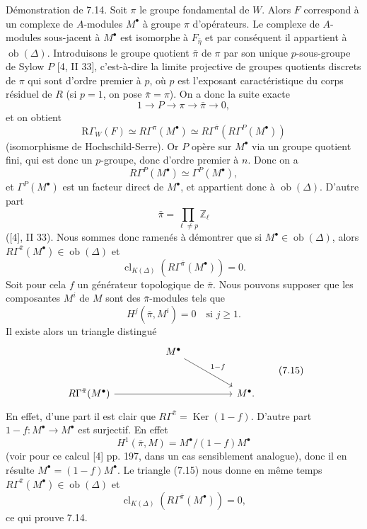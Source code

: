 \documentclass[11pt]{article}
\providecommand{\Ker}{\operatorname{Ker}}
\providecommand{\Ob}{\operatorname{ob}}
\providecommand{\Ker}{\operatorname{Ker}}
\providecommand{\Ker}{\operatorname{Ker}}
\providecommand{\Ob}{\operatorname{ob}}
\providecommand{\Ob}{\operatorname{Ob}}
\providecommand{\clK}[1]{\operatorname{cl}_{K(#1)}}
\providecommand{\RG}{\mathrm R\Gamma}
\providecommand{\Ob}{\operatorname{ob}}
\providecommand{\Ob}{\operatorname{Ob}}
\begin{document}
Démonstration de 7.14. Soit $\pi$ le groupe fondamental de $W$. Alors $F$ correspond à un complexe de $A$-modules $M^\bullet$ à groupe $\pi$ d'opérateurs. Le complexe de $A$-modules sous-jacent à $M^\bullet$ est isomorphe à $F_{\bar\eta}$ et par conséquent il appartient à $\Ob(\Delta)$. Introduisons le groupe quotient $\bar\pi$ de $\pi$ par son unique $p$-sous-groupe de Sylow $P$ [4, II 33], c'est-à-dire la limite projective de groupes quotients discrets de $\pi$ qui sont d'ordre premier à $p$, où $p$ est l'exposant caractéristique du corps résiduel de $R$ (si $p=1$, on pose $\bar\pi=\pi$). On a donc la suite exacte
\[
1\longrightarrow P\longrightarrow \pi\longrightarrow \bar\pi\longrightarrow0,
\]
et on obtient
\[
\RG_W(F)\simeq R\Gamma^\pi(M^\bullet)
\simeq R\Gamma^{\bar\pi}(R\Gamma^P(M^\bullet))
\]
(isomorphisme de Hochschild-Serre). Or $P$ opère sur $M^\bullet$ via un groupe quotient fini, qui est donc un $p$-groupe, donc d'ordre premier à $n$. Donc on a
\[
R\Gamma^P(M^\bullet)\simeq \Gamma^P(M^\bullet),
\]
et $\Gamma^P(M^\bullet)$ est un facteur direct de $M^\bullet$, et appartient donc à $\Ob(\Delta)$. D'autre part
\[
\bar\pi=\prod_{\ell\ne p}\mathbb Z_\ell
\]
([4], II 33). Nous sommes donc ramenés à démontrer que si $M^\bullet\in\Ob(\Delta)$, alors $R\Gamma^{\bar\pi}(M^\bullet)\in\Ob(\Delta)$ et
\[
\clK{\Delta}(R\Gamma^{\bar\pi}(M^\bullet))=0.
\]
Soit pour cela $f$ un générateur topologique de $\bar\pi$. Nous pouvons supposer que les composantes $M^i$ de $M$ sont des $\bar\pi$-modules tels que
\[
H^j(\bar\pi,M^i)=0\quad\text{si }j\ge1.
\]
Il existe alors un triangle distingué
\[
\begin{tikzcd}[column sep=huge,row sep=large]
& M^\bullet \arrow[dr,"1-f"] &\\
R\Gamma^{\bar\pi}(M^\bullet) \arrow[rr] && M^\bullet .
\end{tikzcd}
\tag{7.15}
\]
En effet, d'une part il est clair que $R\Gamma^{\bar\pi}=\Ker(1-f)$. D'autre part $1-f:M^\bullet\to M^\bullet$ est surjectif. En effet
\[
H^1(\bar\pi,M)=M^\bullet/(1-f)M^\bullet
\]
(voir pour ce calcul [4] pp. 197, dans un cas sensiblement analogue), donc il en résulte $M^\bullet=(1-f)M^\bullet$. Le triangle (7.15) nous donne en même temps $R\Gamma^{\bar\pi}(M^\bullet)\in\Ob(\Delta)$ et
\[
\clK{\Delta}(R\Gamma^{\bar\pi}(M^\bullet))=0,
\]
ce qui prouve 7.14.
\end{document}
